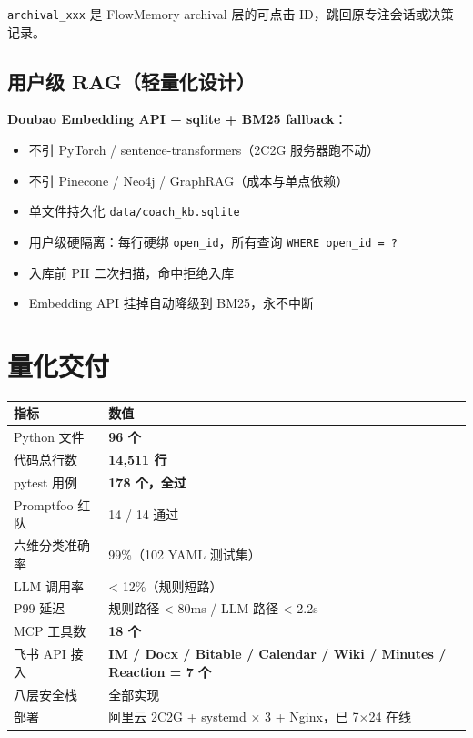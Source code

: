 \documentclass[11pt,a4paper]{ctexart}
\begin{document}
\texttt{archival\_xxx} 是 FlowMemory archival 层的可点击 ID，跳回原专注会话或决策记录。

\subsection{用户级 RAG（轻量化设计）}

\textbf{Doubao Embedding API + sqlite + BM25 fallback}：
\begin{itemize}
\item 不引 PyTorch / sentence-transformers（2C2G 服务器跑不动）
\item 不引 Pinecone / Neo4j / GraphRAG（成本与单点依赖）
\item 单文件持久化 \texttt{data/coach\_kb.sqlite}
\item 用户级硬隔离：每行硬绑 \texttt{open\_id}，所有查询 \texttt{WHERE open\_id = ?}
\item 入库前 PII 二次扫描，命中拒绝入库
\item Embedding API 挂掉自动降级到 BM25，永不中断
\end{itemize}

\section{量化交付}

\begin{tabular}{p{6cm}p{8cm}}
\toprule
\textbf{指标} & \textbf{数值} \\
\midrule
Python 文件 & \textbf{96 个} \\
代码总行数 & \textbf{14{,}511 行} \\
pytest 用例 & \textbf{178 个，全过} \\
Promptfoo 红队 & 14 / 14 通过 \\
六维分类准确率 & 99\%（102 YAML 测试集）\\
LLM 调用率 & < 12\%（规则短路）\\
P99 延迟 & 规则路径 < 80ms / LLM 路径 < 2.2s \\
MCP 工具数 & \textbf{18 个} \\
飞书 API 接入 & \textbf{IM / Docx / Bitable / Calendar / Wiki / Minutes / Reaction = 7 个}\\
八层安全栈 & 全部实现 \\
部署 & 阿里云 2C2G + systemd $\times$ 3 + Nginx，已 7$\times$24 在线 \\
\bottomrule
\end{tabular}

\newpage
\end{document}
